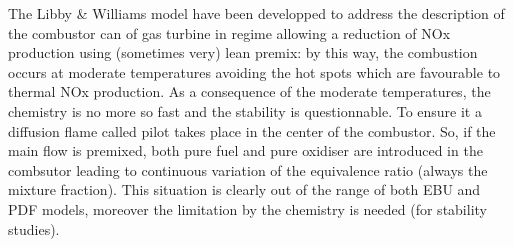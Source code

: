 The Libby \& Williams model have been developped to address the
description of the combustor can of gas turbine in regime allowing a
reduction of NOx production using ({\small sometimes very}) lean
premix: by this way, the combustion occurs at moderate temperatures
avoiding the hot spots which are favourable to thermal NOx
production. As a consequence of the moderate temperatures, the
chemistry is no more so fast and the stability is questionnable. To
ensure it a diffusion flame called pilot takes place in the center of
the combustor. So, if the main flow is premixed, both pure fuel and
pure oxidiser are introduced in the combsutor leading to continuous
variation of the equivalence ratio ({\small always the mixture
fraction}). This situation is clearly out of the range of both EBU and
PDF models, moreover the limitation by the chemistry is needed
({\small for stability studies}).\\

